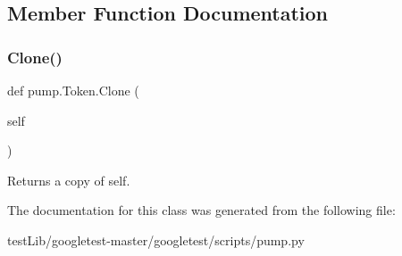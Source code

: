 \subsection{Member Function Documentation}
\mbox{\label{classpump_1_1Token_abc0f2d2a0bcad953f5fc85a4e52076eb}} 
\subsubsection{\texorpdfstring{Clone()}{Clone()}}
{\footnotesize\ttfamily def pump.\+Token.\+Clone (\begin{DoxyParamCaption}\item[{}]{self }\end{DoxyParamCaption})}

\begin{DoxyVerb}Returns a copy of self.\end{DoxyVerb}
 

The documentation for this class was generated from the following file\+:\begin{DoxyCompactItemize}
\item 
test\+Lib/googletest-\/master/googletest/scripts/pump.\+py\end{DoxyCompactItemize}
